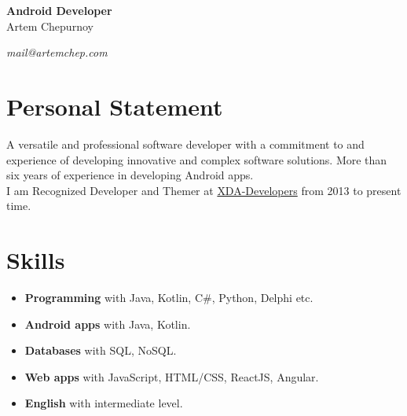 \documentclass[a4paper]{article}
\begin{document}
	\begin{center}
		{\huge\bfseries Android Developer} \\[1em]
		{\Large Artem Chepurnoy} \\[1em]
		\myaddress
	\end{center}
	\vspace{1em}
	\textit{mail@artemchep.com} \hspace*{\fill} \textit{\myphone} 

	\section*{Personal Statement}
	A versatile and professional software developer with a commitment to and experience of developing innovative and complex software solutions. 
	More than six years of experience in developing Android apps. \\[1em]
	I am Recognized Developer and Themer at \href{https://forum.xda-developers.com/member.php?u=3685328}{XDA-Developers} from 2013 to present time.

	\section*{Skills}
	\begin{multicols}{2}
	\begin{itemize}
		\item \textbf{Programming} with Java, Kotlin, C\#, Python, Delphi etc.
		\item \textbf{Android apps} with Java, Kotlin.
		\item \textbf{Databases} with SQL, NoSQL.
		\item \textbf{Web apps} with JavaScript, HTML/CSS, ReactJS, Angular.
		\item \textbf{English} with intermediate level.
	\end{itemize}
	\end{multicols}
\end{document}
